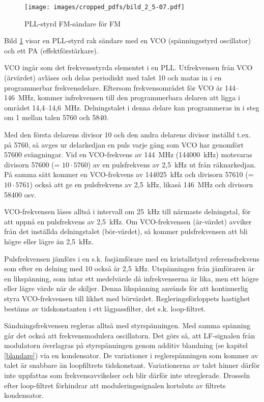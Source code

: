 \begin{figure}
  \texttt{[image: images/cropped\_pdfs/bild\_2\_5-07.pdf]}
  \caption{PLL-styrd FM-sändare för FM}
  \label{fig:bildII5-7}
\end{figure}

Bild \ref{fig:bildII5-7} visar en PLL-styrd rak sändare med en
VCO (spänningsstyrd oscillator) och ett PA (effektförstärkare).

VCO ingår som det frekvensstyrda elementet i en PLL.
Utfrekvensen från VCO (ärvärdet) avläses och delas periodiskt med talet 10
och matas in i en programmerbar frekvensdelare.
Eftersom frekvensområdet för VCO är 144--146~MHz, kommer infrekvensen till
den programmerbara delaren att ligga i området 14,4--14,6~MHz.
Delningstalet i denna delare kan programmeras in i steg om 1 mellan
talen 5760 och 5840.

Med den första delarens divisor 10 och den andra delarens divisor
inställd t.ex. på 5760, så avges ur delarkedjan en puls varje gång som
VCO har genomfört 57600 svängningar.
Vid en VCO-frekvens av 144~MHz (144000~kHz) motsvaras divisorn
57600 (= \(10 \cdot 5760\)) av en pulsfrekvens av 2,5~kHz ut från räknarkedjan.
På samma sätt kommer en VCO-frekvens av 144025~kHz och divisorn
57610 (= \(10 \cdot 5761\)) också att ge en pulsfrekvens av 2,5~kHz,
likaså 146~MHz och divisorn 58400 osv.

VCO-frekvensen låses alltså i intervall om 25~kHz till närmaste
delningstal, för att uppnå en pulsfrekvens av 2,5~kHz.
Om VCO-frekvensen (är-värdet) avviker från det inställda delningstalet
(bör-värdet), så kommer pulsfrekvensen att bli högre eller lägre än
2,5~kHz.

Pulsfrekvensen jämförs i en s.k. fasjämförare med en kristallstyrd
referensfrekvens som efter en delning med 10 också är 2,5~kHz.
Utspänningen från jämföraren är en likspänning, som intar ett
medelvärde då infrekvenserna är lika, men ett högre eller lägre värde
när de skiljer.
Denna likspänning används för att kontinuerlig styra VCO-frekvensen
till likhet med börvärdet.
Regleringsförloppets hastighet bestäms av tidskonstanten i ett
lågpassfilter, det s.k. loop-filtret.

Sändningsfrekvensen regleras alltså med styrspänningen.
Med samma spänning går det också att frekvensmodulera oscillatorn.
Det görs så, att LF-signalen från modulatorn överlagras på styrspänningen genom
additiv blandning (se kapitel \ref{blandare}) via en kondensator.
De variationer i reglerspänningen som kommer av talet är snabbare än
loopfiltrets tidskonstant.
Variationerna av talet hinner därför inte uppfattas som frekvensavvikelser och
blir därför inte utreglerade.
Drosseln efter loop-filtret förhindrar att moduleringssignalen
kortsluts av filtrets kondensator.

